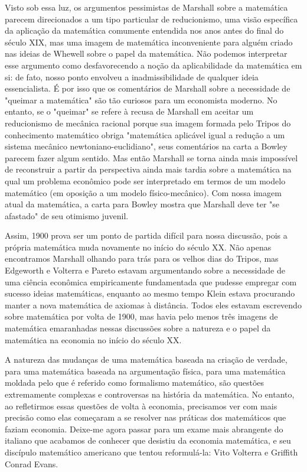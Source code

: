 \documentclass[a4paper,12pt]{article}[abntex2]
\begin{document}
Visto sob essa luz, os argumentos pessimistas de Marshall sobre a matemática parecem direcionados a um tipo particular de reducionismo, uma visão específica da aplicação da matemática comumente entendida nos anos antes do final do século XIX, mas uma imagem de matemática inconveniente para alguém criado nas ideias de Whewell sobre o papel da matemática. Não podemos interpretar esse argumento como desfavorecendo a noção da aplicabilidade da matemática em si: de fato, nosso ponto envolveu a inadmissibilidade de qualquer ideia essencialista. É por isso que os comentários de Marshall sobre a necessidade de "queimar a matemática" são tão curiosos para um economista moderno. No entanto, se o "queimar" se refere à recusa de Marshall em aceitar um reducionismo de mecânica racional porque sua imagem formada pelo Tripos do conhecimento matemático obriga "matemática aplicável igual a redução a um sistema mecânico newtoniano-euclidiano", seus comentários na carta a Bowley parecem fazer algum sentido. Mas então Marshall se torna ainda mais impossível de reconstruir a partir da perspectiva ainda mais tardia sobre a matemática na qual um problema econômico pode ser interpretado em termos de um modelo matemático (em oposição a um modelo físico-mecânico). Com nossa imagem atual da matemática, a carta para Bowley mostra que Marshall deve ter "se afastado" de seu otimismo juvenil.

Assim, 1900 prova ser um ponto de partida difícil para nossa discussão, pois a própria matemática muda novamente no início do século XX. Não apenas encontramos Marshall olhando para trás para os velhos dias do Tripos, mas Edgeworth e Volterra e Pareto estavam argumentando sobre a necessidade de uma ciência econômica empiricamente fundamentada que pudesse empregar com sucesso ideias matemáticas, enquanto ao mesmo tempo Klein estava procurando manter a nova matemática de axiomas à distância. Todos eles estavam escrevendo sobre matemática por volta de 1900, mas havia pelo menos três imagens de matemática emaranhadas nessas discussões sobre a natureza e o papel da matemática na economia no início do século XX.

A natureza das mudanças de uma matemática baseada na criação de verdade, para uma matemática baseada na argumentação física, para uma matemática moldada pelo que é referido como formalismo matemático, são questões extremamente complexas e controversas na história da matemática. No entanto, ao refletirmos essas questões de volta à economia, precisamos ver com mais precisão como elas começaram a se resolver nas práticas dos matemáticos que faziam economia. Deixe-me agora passar para um exame mais abrangente do italiano que acabamos de conhecer que desistiu da economia matemática, e seu discípulo matemático americano que tentou reformulá-la: Vito Volterra e Griffith Conrad Evans.
\end{document}
